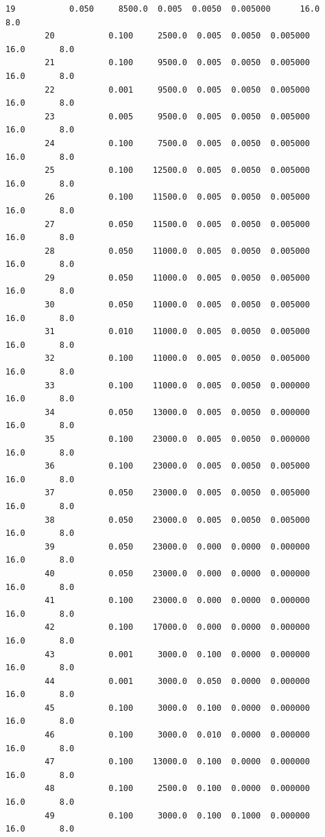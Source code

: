\documentclass[11pt, a4paper , landscape]{article}
\begin{document}
\begin{Verbatim}[commandchars=\\\{\}]
        19           0.050     8500.0  0.005  0.0050  0.005000      16.0       8.0   
        20           0.100     2500.0  0.005  0.0050  0.005000      16.0       8.0   
        21           0.100     9500.0  0.005  0.0050  0.005000      16.0       8.0   
        22           0.001     9500.0  0.005  0.0050  0.005000      16.0       8.0   
        23           0.005     9500.0  0.005  0.0050  0.005000      16.0       8.0   
        24           0.100     7500.0  0.005  0.0050  0.005000      16.0       8.0   
        25           0.100    12500.0  0.005  0.0050  0.005000      16.0       8.0   
        26           0.100    11500.0  0.005  0.0050  0.005000      16.0       8.0   
        27           0.050    11500.0  0.005  0.0050  0.005000      16.0       8.0   
        28           0.050    11000.0  0.005  0.0050  0.005000      16.0       8.0   
        29           0.050    11000.0  0.005  0.0050  0.005000      16.0       8.0   
        30           0.050    11000.0  0.005  0.0050  0.005000      16.0       8.0   
        31           0.010    11000.0  0.005  0.0050  0.005000      16.0       8.0   
        32           0.100    11000.0  0.005  0.0050  0.005000      16.0       8.0   
        33           0.100    11000.0  0.005  0.0050  0.000000      16.0       8.0   
        34           0.050    13000.0  0.005  0.0050  0.000000      16.0       8.0   
        35           0.100    23000.0  0.005  0.0050  0.000000      16.0       8.0   
        36           0.100    23000.0  0.005  0.0050  0.005000      16.0       8.0   
        37           0.050    23000.0  0.005  0.0050  0.005000      16.0       8.0   
        38           0.050    23000.0  0.005  0.0050  0.005000      16.0       8.0   
        39           0.050    23000.0  0.000  0.0000  0.000000      16.0       8.0   
        40           0.050    23000.0  0.000  0.0000  0.000000      16.0       8.0   
        41           0.100    23000.0  0.000  0.0000  0.000000      16.0       8.0   
        42           0.100    17000.0  0.000  0.0000  0.000000      16.0       8.0   
        43           0.001     3000.0  0.100  0.0000  0.000000      16.0       8.0   
        44           0.001     3000.0  0.050  0.0000  0.000000      16.0       8.0   
        45           0.100     3000.0  0.100  0.0000  0.000000      16.0       8.0   
        46           0.100     3000.0  0.010  0.0000  0.000000      16.0       8.0   
        47           0.100    13000.0  0.100  0.0000  0.000000      16.0       8.0   
        48           0.100     2500.0  0.100  0.0000  0.000000      16.0       8.0   
        49           0.100     3000.0  0.100  0.1000  0.000000      16.0       8.0   

\end{Verbatim}
\end{document}
